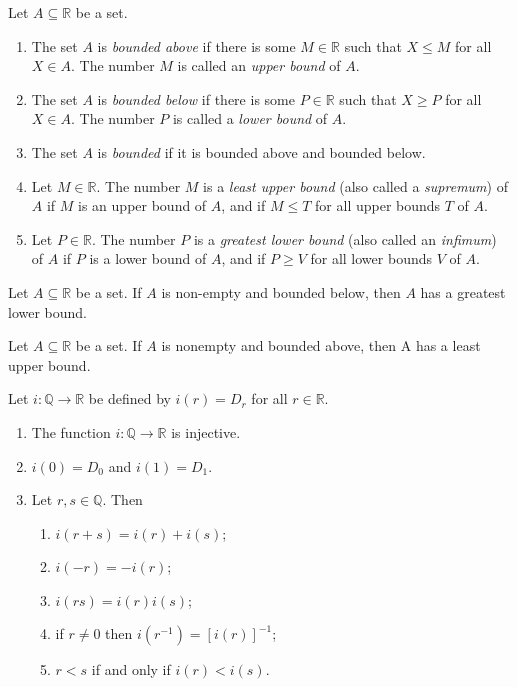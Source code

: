 \begin{definition} %
	Let $A \subseteq \mathbb{R}$ be a set.
	\begin{enumerate}
		\item The set $A$ is \emph{bounded above} if there is some $M \in \mathbb{R}$ such that $X \leq M$ for all $X \in A$. The number $M$ is called an \emph{upper bound} of $A$.
		\item The set $A$ is \emph{bounded below} if there is some $P \in \mathbb{R}$ such that $X \geq P$ for all $X \in A$. The number $P$ is called a \emph{lower bound} of $A$.
		\item The set $A$ is \emph{bounded} if it is bounded above and bounded below.
		\item Let $M \in \mathbb{R}$. The number $M$ is a \emph{least upper bound} (also called a \emph{supremum}) of $A$ if $M$ is an upper bound of $A$, and if $M \leq T$ for all upper bounds $T$ of $A .$
		\item Let $P \in \mathbb{R}$. The number $P$ is a \emph{greatest lower bound} (also called an \emph{infimum}) of $A$ if $P$ is a lower bound of $A$, and if $P \geq V$ for all lower bounds $V$ of $A$.
	\end{enumerate}
\end{definition}

\begin{theorem} %
	Let $A \subseteq \mathbb{R}$ be a set. If $A$ is non-empty and bounded below, then $A$ has a greatest lower bound.
\end{theorem}

\begin{theorem} %
	Let $A \subseteq \mathbb{R}$ be a set. If $A$ is nonempty and bounded above, then A has a least upper bound.
\end{theorem}

\begin{theorem} %
	\label{real:t:rat}
	Let $i: \mathbb{Q} \to \mathbb{R}$ be defined by $i(r) = D_r$ for all $r \in \mathbb{R}$.
	\begin{enumerate}
		\item The function $i: \mathbb{Q} \to \mathbb{R}$ is injective.
		\item $i(0) = D_0$ and $i(1) = D_1$.
		\item Let $r, s \in \mathbb{Q}$. Then
		      \begin{enumerate}
			      \item $i(r + s)=i(r) + i(s)$;
			      \item $i(-r) = -i(r)$;
			      \item $i(r s) = i(r) i(s)$;
			      \item if $r \neq 0$ then $i(r^{-1}) = [i(r)]^{-1}$;
			      \item $r < s$ if and only if $i(r) < i(s)$.
		      \end{enumerate}
	\end{enumerate}
\end{theorem}


